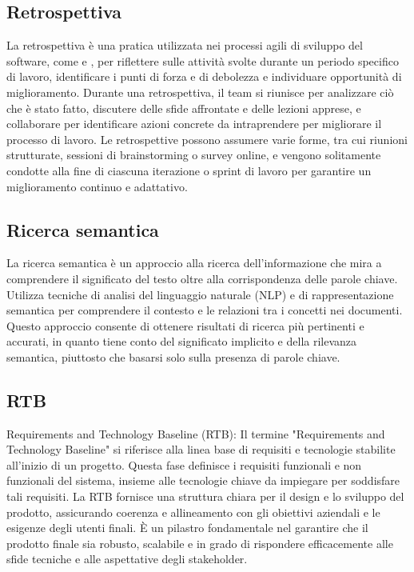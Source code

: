 \vspace{2em}
\subsection*{Retrospettiva}
\par La retrospettiva è una pratica utilizzata nei processi agili di sviluppo del software, come  e , per riflettere sulle attività svolte durante un periodo specifico di lavoro, identificare i punti di forza e di debolezza e individuare opportunità di miglioramento. Durante una retrospettiva, il team si riunisce per analizzare ciò che è stato fatto, discutere delle sfide affrontate e delle lezioni apprese, e collaborare per identificare azioni concrete da intraprendere per migliorare il processo di lavoro. Le retrospettive possono assumere varie forme, tra cui riunioni strutturate, sessioni di brainstorming o survey online, e vengono solitamente condotte alla fine di ciascuna iterazione o sprint di lavoro per garantire un miglioramento continuo e adattativo.

\vspace{2em}
\subsection*{Ricerca semantica}
\par La ricerca semantica è un approccio alla ricerca dell'informazione che mira a comprendere il significato del testo oltre alla corrispondenza delle parole chiave. Utilizza tecniche di analisi del linguaggio naturale (NLP) e di rappresentazione semantica per comprendere il contesto e le relazioni tra i concetti nei documenti. Questo approccio consente di ottenere risultati di ricerca più pertinenti e accurati, in quanto tiene conto del significato implicito e della rilevanza semantica, piuttosto che basarsi solo sulla presenza di parole chiave.

\vspace{2em}
\subsection*{RTB}
\par Requirements and Technology Baseline (RTB): Il termine "Requirements and Technology Baseline" si riferisce alla linea base di requisiti e tecnologie stabilite all'inizio di un progetto. Questa fase definisce i requisiti funzionali e non funzionali del sistema, insieme alle tecnologie chiave da impiegare per soddisfare tali requisiti. La RTB fornisce una struttura chiara per il design e lo sviluppo del prodotto, assicurando coerenza e allineamento con gli obiettivi aziendali e le esigenze degli utenti finali. È un pilastro fondamentale nel garantire che il prodotto finale sia robusto, scalabile e in grado di rispondere efficacemente alle sfide tecniche e alle aspettative degli stakeholder.
